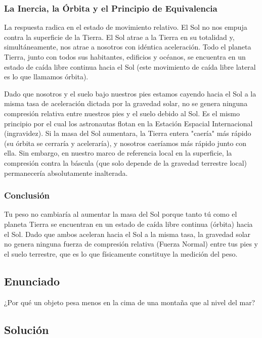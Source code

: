 \documentclass[12pt]{article}
\begin{document}
\subsubsection*{La Inercia, la Órbita y el Principio de Equivalencia}
La respuesta radica en el estado de movimiento relativo. El Sol no nos empuja contra la superficie de la Tierra. El Sol atrae a la Tierra en su totalidad y, simultáneamente, nos atrae a nosotros con idéntica aceleración. Todo el planeta Tierra, junto con todos sus habitantes, edificios y océanos, se encuentra en un estado de caída libre continua hacia el Sol (este movimiento de caída libre lateral es lo que llamamos órbita).

Dado que nosotros y el suelo bajo nuestros pies estamos cayendo hacia el Sol a la misma tasa de aceleración dictada por la gravedad solar, no se genera ninguna compresión relativa entre nuestros pies y el suelo debido al Sol. Es el mismo principio por el cual los astronautas flotan en la Estación Espacial Internacional (ingravidez). Si la masa del Sol aumentara, la Tierra entera "caería" más rápido (su órbita se cerraría y aceleraría), y nosotros caeríamos más rápido junto con ella. Sin embargo, en nuestro marco de referencia local en la superficie, la compresión contra la báscula (que solo depende de la gravedad terrestre local) permanecería absolutamente inalterada.

\subsubsection*{Conclusión}
Tu peso no cambiaría al aumentar la masa del Sol porque tanto tú como el planeta Tierra se encuentran en un estado de caída libre continua (órbita) hacia el Sol. Dado que ambos aceleran hacia el Sol a la misma tasa, la gravedad solar no genera ninguna fuerza de compresión relativa (Fuerza Normal) entre tus pies y el suelo terrestre, que es lo que físicamente constituye la medición del peso.

\newpage

\subsection*{Enunciado}
¿Por qué un objeto pesa menos en la cima de una montaña que al nivel del mar?

\subsection*{Solución}
\end{document}
